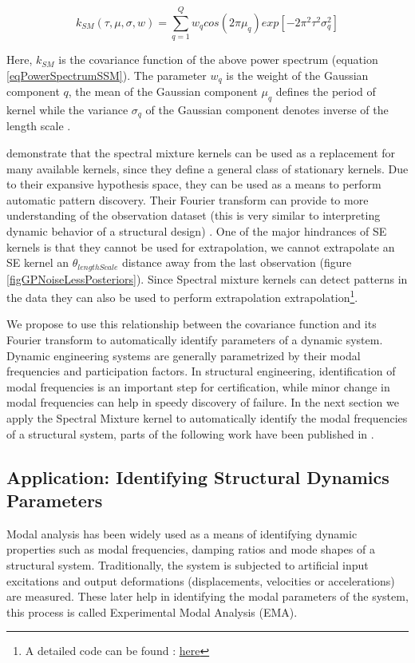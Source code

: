 \begin{equation}\label{eqCovarianceKSM}
k_{SM}(\tau, \mu, \sigma, w) = \sum_{q=1}^{Q}w_{q}cos(2\pi\mu_{q}) exp[-2\pi^{2}\tau^{2}\sigma_{q}^2]
\end{equation}

Here, $k_{SM}$ is the covariance function of the above power spectrum (equation \ref{eqPowerSpectrumSSM}). The parameter $w_{q}$ is the weight of the Gaussian component $q$, the mean of the Gaussian component $\mu_{q}$ defines the period of kernel while the variance $\sigma_{q}$ of the Gaussian component denotes inverse of the length scale . 

\cite{wilson2014thesis} demonstrate that the spectral mixture kernels can be used as a replacement for many available kernels, since they define a general class of stationary kernels. Due to their expansive hypothesis space, they can be used as a means to perform automatic pattern discovery. Their Fourier transform can provide to more understanding of the observation dataset (this is very similar to interpreting dynamic behavior of a structural design) \cite{wilson2013gaussian}. One of the major hindrances of SE kernels is that they cannot be used for extrapolation, we cannot extrapolate an SE kernel an $\theta_{lengthScale}$ distance away from the last observation (figure \ref{figGPNoiseLessPosteriors}). Since Spectral mixture kernels can detect patterns in the data they can also be used to perform extrapolation extrapolation\footnote{A detailed code can be found : \href{https://people.orie.cornell.edu/andrew/code/\#spectral}{here}}. 

We propose to use this relationship between the covariance function and its Fourier transform to automatically identify parameters of a dynamic system. Dynamic engineering systems are generally parametrized by their modal frequencies and participation factors. In structural engineering, identification of modal frequencies is an important step for certification, while minor change in modal frequencies can help in speedy discovery of failure. In the next section we apply the Spectral Mixture kernel to automatically identify the modal frequencies of a structural system, parts of the following work have been published in \cite{chiplunkar2017operational}.

\subsection{Application: Identifying Structural Dynamics Parameters}\label{subSecSMKernelApplication}
Modal analysis has been widely used as a means of identifying dynamic properties such as modal frequencies, damping ratios and mode shapes of a structural system. Traditionally, the system is subjected to artificial input excitations and output deformations (displacements, velocities or accelerations) are measured. These later help in identifying the modal parameters of the system, this process is called Experimental Modal Analysis (EMA). 

